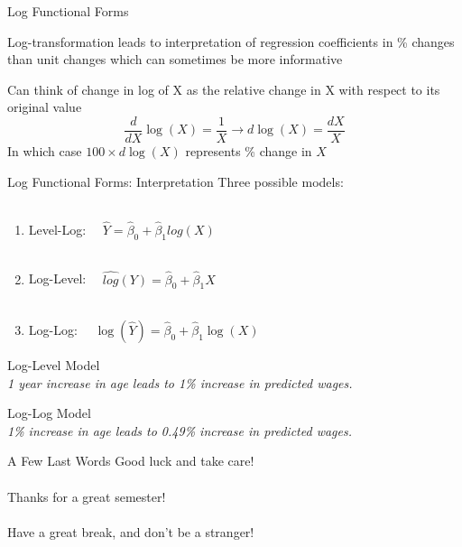 \documentclass{./../div_teaching_slides}
\begin{document}
\begin{frame}{Log Functional Forms}
\vspace{-0.5em}
\begin{witemize}
  \item Log-transformation leads to interpretation of regression coefficients in \% changes than unit changes which can sometimes be more informative 
  \item Can think of change in log of X as the relative change in X with respect to its original value
  $$ \frac{d}{dX} \log(X) = \frac{1}{X} \rightarrow d \log(X) = \frac{d X}{X} $$
  In which case $100 \times d\log(X)$ represents \% change in $X$
\end{witemize}
\end{frame}


\begin{frame}{Log Functional Forms: Interpretation}
Three possible models: \\~\\
\begin{enumerate}
  \item Level-Log: $ \quad \hat{Y} = \hat{\beta}_0 +  \hat{\beta}_1 log(X) $ \\~\\
  \item Log-Level: $ \quad \hat{log}(Y) = \hat{\beta}_0 +  \hat{\beta}_1 X $ \\~\\
  \item Log-Log: $ \quad \log(\hat{Y}) = \hat{\beta}_0 +  \hat{\beta}_1 \log(X) $
\end{enumerate}
\end{frame}

\begin{frame}{Log-Level Model}
\centering \small \vspace{-0.5em}
 \\ \vspace{1.5em}
\normalsize \textit{1 year increase in age leads to 1\% increase in predicted wages.} 
\end{frame}


\begin{frame}{Log-Log Model}
\centering \small \vspace{-0.5em}
 \\ \vspace{1.5em}
\normalsize \textit{1\% increase in age leads to 0.49\% increase in predicted wages.} 
\end{frame}

\begin{frame}{A Few Last Words}
\vspace{0.7em}
\large \centering
Good luck and take care! \\~\\
Thanks for a great
semester! \\~\\
Have a great break, and don’t be a stranger!
\end{frame}
\end{document}
